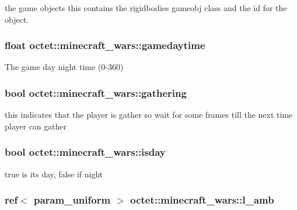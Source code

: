 the game objects this contains the rigidbodies gameobj class and the id for the object. 

\hypertarget{classoctet_1_1minecraft__wars_aff5df5d4844cc380f26eb21b28537987}{
\subsubsection[{gamedaytime}]{\setlength{\rightskip}{0pt plus 5cm}float octet\+::minecraft\+\_\+wars\+::gamedaytime\hspace{0.3cm}{\ttfamily [private]}}}\label{classoctet_1_1minecraft__wars_aff5df5d4844cc380f26eb21b28537987}


The game day night time (0-\/360) 

\hypertarget{classoctet_1_1minecraft__wars_ae02d056bcc40e7b09635ab2856d8d5d7}{
\subsubsection[{gathering}]{\setlength{\rightskip}{0pt plus 5cm}bool octet\+::minecraft\+\_\+wars\+::gathering\hspace{0.3cm}{\ttfamily [private]}}}\label{classoctet_1_1minecraft__wars_ae02d056bcc40e7b09635ab2856d8d5d7}


this indicates that the player is gather so wait for some frames till the next time player can gather 

\hypertarget{classoctet_1_1minecraft__wars_ad53fa9489507ea201f30c4a929dd0f77}{
\subsubsection[{isday}]{\setlength{\rightskip}{0pt plus 5cm}bool octet\+::minecraft\+\_\+wars\+::isday\hspace{0.3cm}{\ttfamily [private]}}}\label{classoctet_1_1minecraft__wars_ad53fa9489507ea201f30c4a929dd0f77}


true is its day, false if night 

\hypertarget{classoctet_1_1minecraft__wars_aca1e4733d35f84e6e7beb0922091071a}{
\subsubsection[{l\+\_\+amb}]{\setlength{\rightskip}{0pt plus 5cm}ref$<$ param\+\_\+uniform $>$ octet\+::minecraft\+\_\+wars\+::l\+\_\+amb\hspace{0.3cm}{\ttfamily [private]}}}\label{classoctet_1_1minecraft__wars_aca1e4733d35f84e6e7beb0922091071a}


